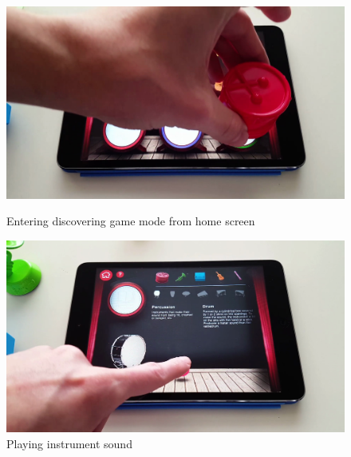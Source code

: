 \begin{figure}[ht!]
  \centering
  \includegraphics[width=350pt]{graphics/game-play/enter_discovering_mode.png}
  \vspace{0.05cm}
  \caption{Entering discovering game mode from home screen}
  \vspace{1cm}

  \includegraphics[width=350pt]{graphics/game-play/instrument_sound_discovering.png}
  \vspace{0.05cm}
  \caption{Playing instrument sound}
\end{figure}


